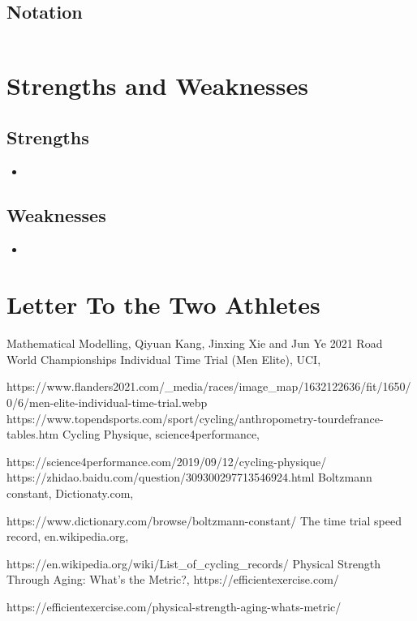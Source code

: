 \documentclass{article}
\begin{document}
		\subsection{Notation}
			\begin{tabular}{|l|l|l|}
				\hline
			\end{tabular}
	\section{Strengths and Weaknesses}
		\subsection*{Strengths}
			\begin{itemize}
				\item
			\end{itemize}
		\subsection*{Weaknesses}

			\begin{itemize}
				\item
			\end{itemize}
	\newpage
	\section{Letter To the Two Athletes}
	\newpage
	\thispagestyle{empty}
	\renewcommand\refname{References}
	\clearpage
	\begin{thebibliography}{100}
		 Mathematical Modelling, Qiyuan Kang, Jinxing Xie and Jun Ye
		2021 Road World Championships Individual Time Trial (Men Elite), UCI,

		https://www.flanders2021.com/\_media/races/image\_map/1632122636/fit/1650/0/6/men-elite-individual-time-trial.webp
		https://www.topendsports.com/sport/cycling/anthropometry-tourdefrance-tables.htm
		Cycling Physique, science4performance,

		https://science4performance.com/2019/09/12/cycling-physique/
		https://zhidao.baidu.com/question/309300297713546924.html
		Boltzmann constant, Dictionaty.com,

		https://www.dictionary.com/browse/boltzmann-constant/
		The time trial speed record, en.wikipedia.org,

		https://en.wikipedia.org/wiki/List\_of\_cycling\_records/
		Physical Strength Through Aging: What’s the Metric?, https://efficientexercise.com/

		https://efficientexercise.com/physical-strength-aging-whats-metric/
	\end{thebibliography}
\end{document}
